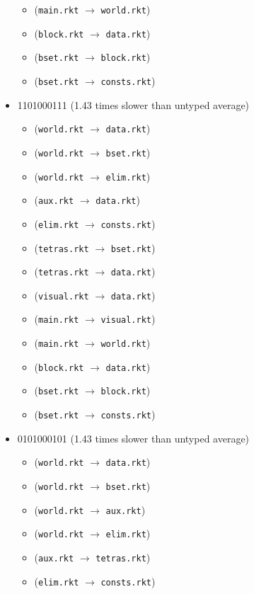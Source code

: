 \documentclass{article}
\newcommand{\mono}[1]{\texttt{#1}}
\begin{document}
\begin{itemize}
\begin{itemize}
  \item (\mono{main.rkt} $\rightarrow$ \mono{world.rkt})
  \item (\mono{block.rkt} $\rightarrow$ \mono{data.rkt})
  \item (\mono{bset.rkt} $\rightarrow$ \mono{block.rkt})
  \item (\mono{bset.rkt} $\rightarrow$ \mono{consts.rkt})
  \end{itemize}
\item 1101000111 (1.43 times slower than untyped average)
  \begin{itemize}
  \item (\mono{world.rkt} $\rightarrow$ \mono{data.rkt})
  \item (\mono{world.rkt} $\rightarrow$ \mono{bset.rkt})
  \item (\mono{world.rkt} $\rightarrow$ \mono{elim.rkt})
  \item (\mono{aux.rkt} $\rightarrow$ \mono{data.rkt})
  \item (\mono{elim.rkt} $\rightarrow$ \mono{consts.rkt})
  \item (\mono{tetras.rkt} $\rightarrow$ \mono{bset.rkt})
  \item (\mono{tetras.rkt} $\rightarrow$ \mono{data.rkt})
  \item (\mono{visual.rkt} $\rightarrow$ \mono{data.rkt})
  \item (\mono{main.rkt} $\rightarrow$ \mono{visual.rkt})
  \item (\mono{main.rkt} $\rightarrow$ \mono{world.rkt})
  \item (\mono{block.rkt} $\rightarrow$ \mono{data.rkt})
  \item (\mono{bset.rkt} $\rightarrow$ \mono{block.rkt})
  \item (\mono{bset.rkt} $\rightarrow$ \mono{consts.rkt})
  \end{itemize}
\item 0101000101 (1.43 times slower than untyped average)
  \begin{itemize}
  \item (\mono{world.rkt} $\rightarrow$ \mono{data.rkt})
  \item (\mono{world.rkt} $\rightarrow$ \mono{bset.rkt})
  \item (\mono{world.rkt} $\rightarrow$ \mono{aux.rkt})
  \item (\mono{world.rkt} $\rightarrow$ \mono{elim.rkt})
  \item (\mono{aux.rkt} $\rightarrow$ \mono{tetras.rkt})
  \item (\mono{elim.rkt} $\rightarrow$ \mono{consts.rkt})

\end{itemize}
\end{itemize}
\end{document}
